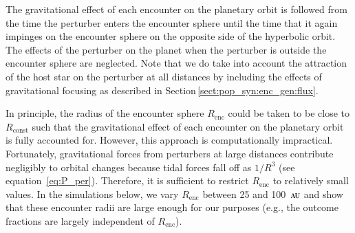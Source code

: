\documentclass[iop,usenatbib]{emulateapj}
\renewcommand{\S}{Section}
\newcommand{\au}{\,\textsc{au}}
\newcommand{\renc}{R_\mathrm{enc}}
\begin{document}
The gravitational effect of each encounter on the planetary orbit is followed from the time the perturber enters the encounter sphere until the time that it again impinges on the encounter sphere on the opposite side of the hyperbolic orbit. The effects of the perturber on the planet when the perturber is outside the encounter sphere are neglected. Note that we do take into account the attraction of the host star on the perturber at all distances by including the effects of gravitational focusing as described in \S\,\ref{sect:pop_syn:enc_gen:flux}.

In principle, the radius of the encounter sphere $\renc$ could be taken to be close to $R_\mathrm{const}$ such that the gravitational effect of each encounter on the planetary orbit is fully accounted for. However, this approach is computationally impractical. Fortunately, gravitational forces from perturbers at large distances contribute negligibly to orbital changes because tidal forces fall off as $1/R^3$ (see equation~\ref{eq:P_per}).  Therefore, it is sufficient to restrict $\renc$ to relatively small values. In the simulations below, we vary $\renc$ between 25 and 100 $\au$ and show that these encounter radii are large enough for our purposes (e.g., the outcome fractions are largely independent of $\renc$).
\end{document}
